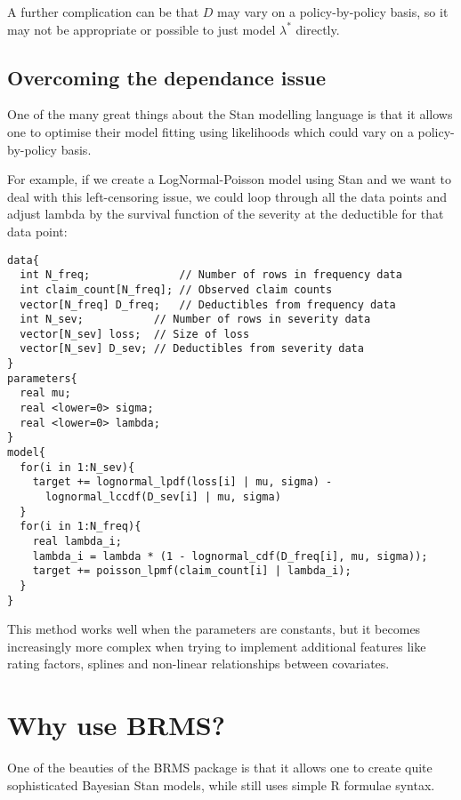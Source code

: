 \documentclass[
]{book}
\begin{document}
A further complication can be that \(D\) may vary on a policy-by-policy basis, so it may not be appropriate or possible to just model \(\lambda^*\) directly.

\hypertarget{overcoming-the-dependance-issue}{%
\subsection{Overcoming the dependance issue}\label{overcoming-the-dependance-issue}}

One of the many great things about the Stan modelling language is that it allows one to optimise their model fitting using likelihoods which could vary on a policy-by-policy basis.

For example, if we create a LogNormal-Poisson model using Stan and we want to deal with this left-censoring issue, we could loop through all the data points and adjust lambda by the survival function of the severity at the deductible for that data point:

\begin{verbatim}
data{
  int N_freq;              // Number of rows in frequency data
  int claim_count[N_freq]; // Observed claim counts
  vector[N_freq] D_freq;   // Deductibles from frequency data
  int N_sev;           // Number of rows in severity data
  vector[N_sev] loss;  // Size of loss 
  vector[N_sev] D_sev; // Deductibles from severity data
}
parameters{
  real mu;
  real <lower=0> sigma;
  real <lower=0> lambda;
}
model{
  for(i in 1:N_sev){
    target += lognormal_lpdf(loss[i] | mu, sigma) -
      lognormal_lccdf(D_sev[i] | mu, sigma)
  }
  for(i in 1:N_freq){
    real lambda_i;
    lambda_i = lambda * (1 - lognormal_cdf(D_freq[i], mu, sigma));
    target += poisson_lpmf(claim_count[i] | lambda_i);
  }
}
\end{verbatim}

This method works well when the parameters are constants, but it becomes increasingly more complex when trying to implement additional features like rating factors, splines and non-linear relationships between covariates.

\hypertarget{why-use-brms}{%
\section{Why use BRMS?}\label{why-use-brms}}

One of the beauties of the BRMS package is that it allows one to create quite sophisticated Bayesian Stan models, while still uses simple R formulae syntax.
\end{document}
